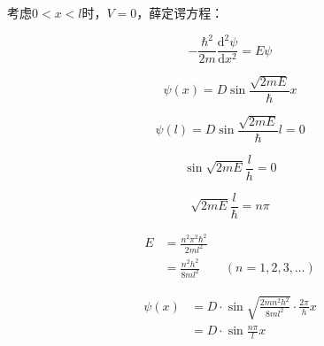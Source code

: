 \documentclass[a4paper]{ctexrep}
\renewcommand{\d}{\mathrm{d}}
\begin{document}
    考虑$0 < x < l$时，$V=0$，薛定谔方程：

    \[
        -\frac{\hbar^2}{2m} \frac{\d^2 \psi}{\d x^2} = E \psi
    \]

    \[
        \psi(x) = D \sin \frac{\sqrt{2mE}}{\hbar} x   
    \]

    \[
        \psi(l) = D \sin \frac{\sqrt{2mE}}{\hbar} l = 0
    \]

    \[
        \sin \sqrt{2mE} \frac{l}{h} = 0
    \]

    \[
        \sqrt{2mE} \frac{l}{\hbar} = n \pi 
    \]

    \begin{align*}
        E &= \frac{n^2\pi^2\hbar^2}{2ml^2} \\
        &= \frac{n^2h^2}{8ml^2} \qquad (n = 1, 2, 3, \dots)
    \end{align*}

    \begin{align*}
        \psi (x) &= D \cdot \sin \sqrt{\frac{2mn^2h^2}{8ml^2} } \cdot \frac{2\pi}{h} x \\
        &= D \cdot \sin \frac{n\pi}{l} x
    \end{align*}
\end{document}
